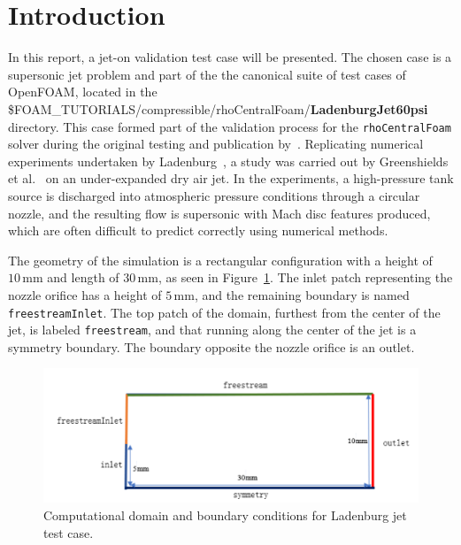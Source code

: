 \documentclass[12pt]{article}
\begin{document}
\newpage

\section{Introduction}\label{sec:introduction}
In this report, a jet-on validation test case will be presented. The chosen case is a supersonic jet problem and part of the the canonical suite of test cases of OpenFOAM, located in the \$FOAM\_TUTORIALS/compressible/rhoCentralFoam/\textbf{LadenburgJet60psi} directory. This case formed part of the validation process for the \texttt{rhoCentralFoam} solver during the original testing and publication by~\cite{greenshields2010implementation}. Replicating numerical experiments undertaken by Ladenburg~\cite{ladenburg1948interferometric,ladenburg1949interferometric}, a study was carried out by Greenshields et al.~\cite{greenshields2010implementation} on an under-expanded dry air jet. In the experiments, a high-pressure tank source is discharged into atmospheric pressure conditions through a circular nozzle, and the resulting flow is supersonic with Mach disc features produced, which are often difficult to predict correctly using numerical methods.

The geometry of the simulation is a rectangular configuration with a height of $10\,\text{mm}$ and length of $30\,\text{mm}$, as seen in Figure~\ref{fig:geometry}. The inlet patch representing the nozzle orifice has a height of $5\,\text{mm}$, and the remaining boundary is named \texttt{freestreamInlet}. The top patch of the domain, furthest from the center of the jet, is labeled \texttt{freestream}, and that running along the center of the jet is a symmetry boundary. The boundary opposite the nozzle orifice is an outlet.

\begin{figure}[H]
  \centering
  \includegraphics[width=\textwidth]{figs/geometry.png}
  \caption{Computational domain and boundary conditions for Ladenburg jet test case.}
  \label{fig:geometry}
\end{figure}
\end{document}
